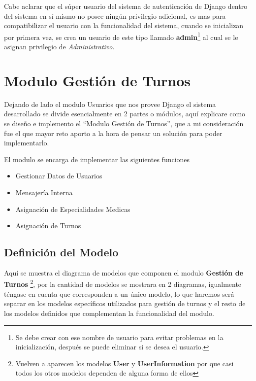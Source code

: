 Cabe aclarar que el súper usuario del sistema de autenticación de Django dentro del sistema en sí mismo no posee ningún privilegio adicional, es mas para compatibilizar el usuario con la funcionalidad del sistema, cuando se inicializan por primera vez, se crea un usuario de este tipo llamado \textbf{admin}\footnote{Se debe crear con ese nombre de usuario para evitar problemas en la inicialización, después se puede eliminar si se desea el usuario.} al cual se le asignan privilegio de \textit{Administrativo}.



\section{Modulo Gestión de Turnos} 

Dejando de lado el modulo Usuarios que nos provee Django el sistema desarrollado se divide esencialmente en 2 partes o módulos, aquí explicare como se diseño e implemento el ``Modulo Gestión de Turnos”, que a mi consideración fue el que mayor reto aporto a la hora de pensar un solución para poder implementarlo.

El modulo se encarga de implementar las siguientes funciones

\begin{itemize}
    \item Gestionar Datos de Usuarios
    \item Mensajería Interna
    \item Asignación de Especialidades Medicas
    \item Asignación de Turnos
\end{itemize}


\subsection{Definición del Modelo}

Aquí se muestra el diagrama de modelos que componen el modulo \textbf{Gestión de Turnos} \footnote{Vuelven a aparecen los modelos \textbf{User} y \textbf{UserInformation} por que casi todos los otros modelos dependen de alguna forma de ellos}, por la cantidad de modelos se mostrara en 2 diagramas, igualmente téngase en cuenta que corresponden a un único modelo, lo que haremos será separar en los modelos específicos utilizados para gestión de turnos y el resto de los modelos definidos que complementan la funcionalidad del modulo.

